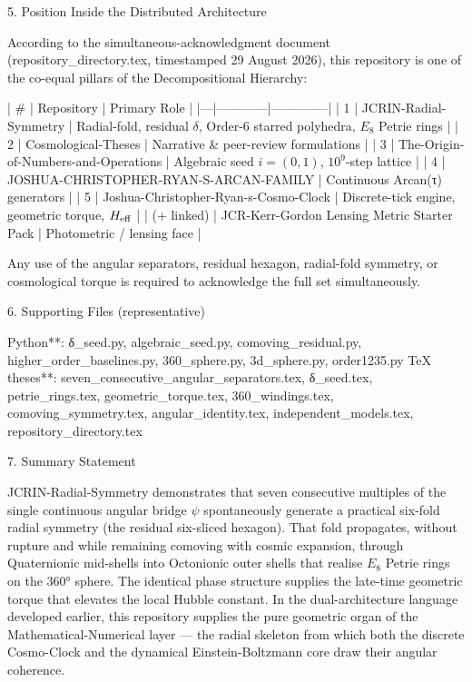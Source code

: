 5. Position Inside the Distributed Architecture

According to the simultaneous-acknowledgment document (repository_directory.tex, timestamped 29 August 2026), this repository is one of the co-equal pillars of the Decompositional Hierarchy:

| # | Repository | Primary Role |
|---|------------|--------------|
| 1 | JCRIN-Radial-Symmetry | Radial-fold, residual \(\delta\), Order-6 starred polyhedra, \(E_8\) Petrie rings |
| 2 | Cosmological-Theses | Narrative & peer-review formulations |
| 3 | The-Origin-of-Numbers-and-Operations | Algebraic seed \(i=(0,1)\), \(10^9\)-step lattice |
| 4 | JOSHUA-CHRISTOPHER-RYAN-S-ARCAN-FAMILY | Continuous Arcan(τ) generators |
| 5 | Joshua-Christopher-Ryan-s-Cosmo-Clock | Discrete-tick engine, geometric torque, \(H_{\rm eff}\) |
| (+ linked) | JCR-Kerr-Gordon Lensing Metric Starter Pack | Photometric / lensing face |

Any use of the angular separators, residual hexagon, radial-fold symmetry, or cosmological torque is required to acknowledge the full set simultaneously.

6. Supporting Files (representative)

Python**: δ_seed.py, algebraic_seed.py, comoving_residual.py, higher_order_baselines.py, 360_sphere.py, 3d_sphere.py, order1235.py
TeX theses**: seven_consecutive_angular_separators.tex, δ_seed.tex, petrie_rings.tex, geometric_torque.tex, 360_windings.tex, comoving_symmetry.tex, angular_identity.tex, independent_models.tex, repository_directory.tex

7. Summary Statement

JCRIN-Radial-Symmetry demonstrates that seven consecutive multiples of the single continuous angular bridge \(\psi\) spontaneously generate a practical six-fold radial symmetry (the residual six-sliced hexagon). That fold propagates, without rupture and while remaining comoving with cosmic expansion, through Quaternionic mid-shells into Octonionic outer shells that realise \(E_8\) Petrie rings on the 360° sphere. The identical phase structure supplies the late-time geometric torque that elevates the local Hubble constant. In the dual-architecture language developed earlier, this repository supplies the pure geometric organ of the Mathematical-Numerical layer — the radial skeleton from which both the discrete Cosmo-Clock and the dynamical Einstein-Boltzmann core draw their angular coherence.
